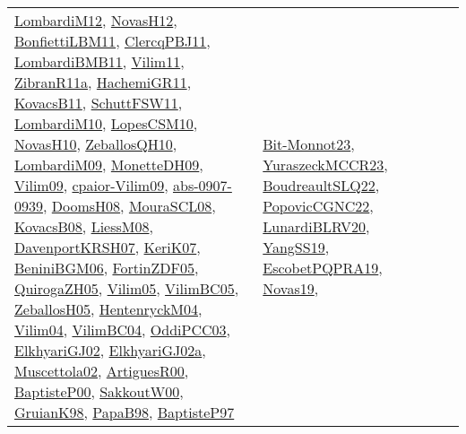 {\begin{longtable}{lp{3cm}>{\raggedright}p{6cm}>{\raggedright}p{6cm}p{8cm}}
\href{articles/LombardiM12.pdf}{LombardiM12}\cite{LombardiM12}, \href{articles/NovasH12.pdf}{NovasH12}\cite{NovasH12}, \href{papers/BonfiettiLBM11.pdf}{BonfiettiLBM11}\cite{BonfiettiLBM11}, \href{papers/ClercqPBJ11.pdf}{ClercqPBJ11}\cite{ClercqPBJ11}, \href{papers/LombardiBMB11.pdf}{LombardiBMB11}\cite{LombardiBMB11}, \href{papers/Vilim11.pdf}{Vilim11}\cite{Vilim11}, \href{papers/ZibranR11a.pdf}{ZibranR11a}\cite{ZibranR11a}, \href{articles/HachemiGR11.pdf}{HachemiGR11}\cite{HachemiGR11}, \href{articles/KovacsB11.pdf}{KovacsB11}\cite{KovacsB11}, \href{articles/SchuttFSW11.pdf}{SchuttFSW11}\cite{SchuttFSW11}, \href{papers/LombardiM10.pdf}{LombardiM10}\cite{LombardiM10}, \href{articles/LopesCSM10.pdf}{LopesCSM10}\cite{LopesCSM10}, \href{articles/NovasH10.pdf}{NovasH10}\cite{NovasH10}, \href{articles/ZeballosQH10.pdf}{ZeballosQH10}\cite{ZeballosQH10}, \href{papers/LombardiM09.pdf}{LombardiM09}\cite{LombardiM09}, \href{papers/MonetteDH09.pdf}{MonetteDH09}\cite{MonetteDH09}, \href{papers/Vilim09.pdf}{Vilim09}\cite{Vilim09}, \href{papers/cpaior-Vilim09.pdf}{cpaior-Vilim09}\cite{cpaior-Vilim09}, \href{articles/abs-0907-0939.pdf}{abs-0907-0939}\cite{abs-0907-0939}, \href{papers/DoomsH08.pdf}{DoomsH08}\cite{DoomsH08}, \href{papers/MouraSCL08.pdf}{MouraSCL08}\cite{MouraSCL08}, \href{articles/KovacsB08.pdf}{KovacsB08}\cite{KovacsB08}, \href{articles/LiessM08.pdf}{LiessM08}\cite{LiessM08}, \href{papers/DavenportKRSH07.pdf}{DavenportKRSH07}\cite{DavenportKRSH07}, \href{papers/KeriK07.pdf}{KeriK07}\cite{KeriK07}, \href{papers/BeniniBGM06.pdf}{BeniniBGM06}\cite{BeniniBGM06}, \href{papers/FortinZDF05.pdf}{FortinZDF05}\cite{FortinZDF05}, \href{papers/QuirogaZH05.pdf}{QuirogaZH05}\cite{QuirogaZH05}, \href{papers/Vilim05.pdf}{Vilim05}\cite{Vilim05}, \href{articles/VilimBC05.pdf}{VilimBC05}\cite{VilimBC05}, \href{articles/ZeballosH05.pdf}{ZeballosH05}\cite{ZeballosH05}, \href{papers/HentenryckM04.pdf}{HentenryckM04}\cite{HentenryckM04}, \href{papers/Vilim04.pdf}{Vilim04}\cite{Vilim04}, \href{papers/VilimBC04.pdf}{VilimBC04}\cite{VilimBC04}, \href{papers/OddiPCC03.pdf}{OddiPCC03}\cite{OddiPCC03}, \href{papers/ElkhyariGJ02.pdf}{ElkhyariGJ02}\cite{ElkhyariGJ02}, \href{papers/ElkhyariGJ02a.pdf}{ElkhyariGJ02a}\cite{ElkhyariGJ02a}, \href{papers/Muscettola02.pdf}{Muscettola02}\cite{Muscettola02}, \href{articles/ArtiguesR00.pdf}{ArtiguesR00}\cite{ArtiguesR00}, \href{articles/BaptisteP00.pdf}{BaptisteP00}\cite{BaptisteP00}, \href{articles/SakkoutW00.pdf}{SakkoutW00}\cite{SakkoutW00}, \href{papers/GruianK98.pdf}{GruianK98}\cite{GruianK98}, \href{articles/PapaB98.pdf}{PapaB98}\cite{PapaB98}, \href{papers/BaptisteP97.pdf}{BaptisteP97}\cite{BaptisteP97} & \href{papers/Bit-Monnot23.pdf}{Bit-Monnot23}\cite{Bit-Monnot23}, \href{articles/YuraszeckMCCR23.pdf}{YuraszeckMCCR23}\cite{YuraszeckMCCR23}, \href{papers/BoudreaultSLQ22.pdf}{BoudreaultSLQ22}\cite{BoudreaultSLQ22}, \href{papers/PopovicCGNC22.pdf}{PopovicCGNC22}\cite{PopovicCGNC22}, \href{articles/LunardiBLRV20.pdf}{LunardiBLRV20}\cite{LunardiBLRV20}, \href{papers/YangSS19.pdf}{YangSS19}\cite{YangSS19}, \href{articles/EscobetPQPRA19.pdf}{EscobetPQPRA19}\cite{EscobetPQPRA19}, \href{articles/Novas19.pdf}{Novas19}\cite{Novas19}, 
\end{longtable}}
